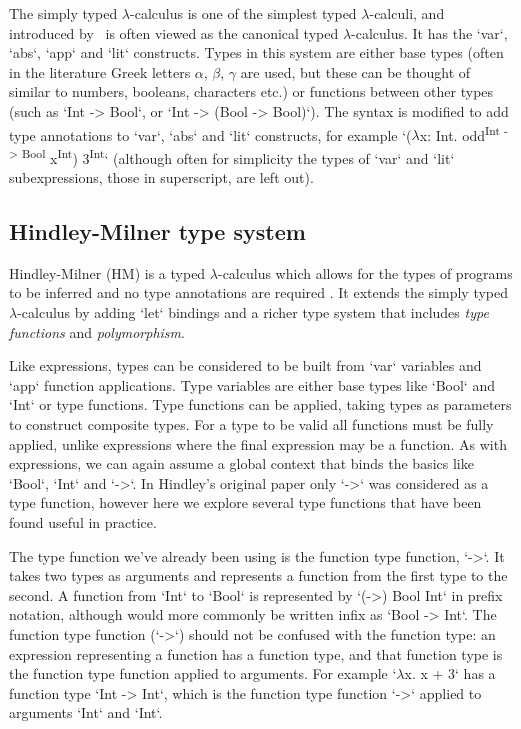 \documentclass[a4paper,fleqn,12pt]{article}
\begin{document}
The simply typed $\lambda$-calculus is one of the simplest typed $\lambda$-calculi, and introduced by~\cite{ref10} is often viewed as the canonical typed $\lambda$-calculus. It has the `var`, `abs`, `app` and `lit` constructs. Types in this system are either base types (often in the literature Greek letters $\alpha$, $\beta$, $\gamma$ are used, but these can be thought of similar to numbers, booleans, characters etc.) or functions between other types (such as `Int -> Bool`, or `Int -> (Bool -> Bool)`). The syntax is modified to add type annotations to `var`, `abs` and `lit` constructs, for example `($\lambda$x: Int. odd\textsuperscript{Int -> Bool} x\textsuperscript{Int}) 3\textsuperscript{Int}` (although often for simplicity the types of `var` and `lit` subexpressions, those in superscript, are left out).

\subsection{Hindley-Milner type system}\label{id:h.gsouq2axz3k}

Hindley-Milner (HM) is a typed $\lambda$-calculus which allows for the types of programs to be inferred and no type annotations are required \citep{ref11,ref12}. It extends the simply typed $\lambda$-calculus by adding `let` bindings and a richer type system that includes \textit{type functions} and \textit{polymorphism}.

Like expressions, types can be considered to be built from `var` variables and `app` function applications. Type variables are either base types like `Bool` and `Int` or type functions. Type functions can be applied, taking types as parameters to construct composite types. For a type to be valid all functions must be fully applied, unlike expressions where the final expression may be a function.  As with expressions, we can again assume a global context that binds the basics like `Bool`, `Int` and `->`. In Hindley’s original paper only `->` was considered as a type function, however here we explore several type functions that have been found useful in practice.

The type function we’ve already been using is the function type function, `->`. It takes two types as arguments and represents a function from the first type to the second. A function from `Int` to `Bool` is represented by `(->) Bool Int` in prefix notation, although would more commonly be written infix as `Bool -> Int`. The function type function (`->`) should not be confused with the function type: an expression representing a function has a function type, and that function type is the function type function applied to arguments. For example `$\lambda$x. x + 3` has a function type `Int -> Int`, which is the function type function `->` applied to arguments `Int` and `Int`.
\end{document}
